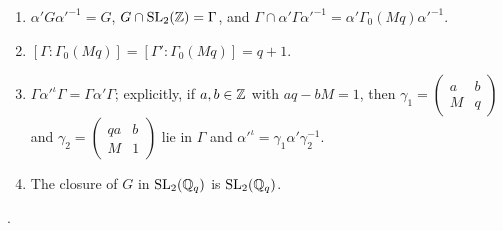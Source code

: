 \begin{lemma}\label{lem:s03-groups}\leavevmode
\begin{enumerate}[label=(\alph*)]
\item $\alpha'G\alpha'^{-1}=G$, $G\cap\mathrm{SL}_2(\mathbb{Z})=\Gamma$, and $\Gamma\cap\alpha'\Gamma\alpha'^{-1}=\alpha'\Gamma_0(Mq)\alpha'^{-1}$.
\item $[\Gamma:\Gamma_0(Mq)]=[\Gamma':\Gamma_0(Mq)]=q+1$.
\item $\Gamma\alpha'^\iota\Gamma=\Gamma\alpha'\Gamma$; explicitly, if $a,b\in\mathbb{Z}$ with $aq-bM=1$, then $\gamma_1=\left(\begin{smallmatrix}a&b\\M&q\end{smallmatrix}\right)$ and
  $\gamma_2=\left(\begin{smallmatrix}qa&b\\M&1\end{smallmatrix}\right)$ lie in $\Gamma$ and $\alpha'^\iota=\gamma_1\alpha'\gamma_2^{-1}$.
\item The closure of $G$ in $\mathrm{SL}_2(\mathbb{Q}_q)$ is $\mathrm{SL}_2(\mathbb{Q}_q)$.
\end{enumerate}
\stproved.
\end{lemma}
